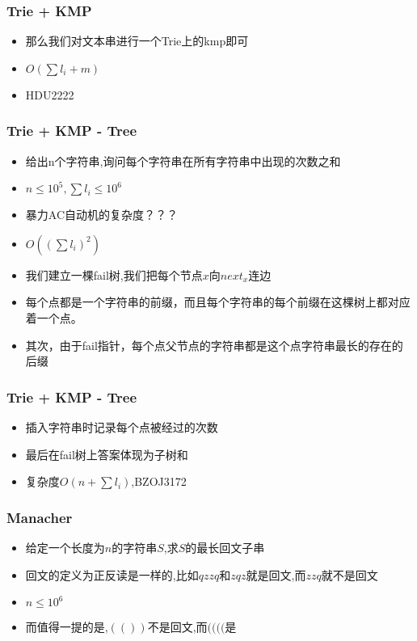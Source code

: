 \documentclass[notheorems]{beamer}
\begin{document}
\begin{frame}
\frametitle{Trie + KMP}
\begin{itemize}[]
\item 那么我们对文本串进行一个Trie上的kmp即可
\item $O(\sum l_i + m)$
\item HDU2222
\end{itemize}
\end{frame}

\begin{frame}
\frametitle{Trie + KMP - Tree}
\begin{itemize}[]
\item 给出n个字符串,询问每个字符串在所有字符串中出现的次数之和
\item $n\leq 10^5,\sum l_i \leq 10^6$
\pause
\item 暴力AC自动机的复杂度？？？
\pause
\item $O((\sum l_i)^2)$
\pause
\item 我们建立一棵fail树,我们把每个节点$x$向$next_x$连边
\pause
\item 每个点都是一个字符串的前缀，而且每个字符串的每个前缀在这棵树上都对应着一个点。
\item 其次，由于fail指针，每个点父节点的字符串都是这个点字符串最长的存在的后缀
\end{itemize}
\end{frame}


\begin{frame}
\frametitle{Trie + KMP - Tree}
\begin{itemize}[]
\item 插入字符串时记录每个点被经过的次数
\item 最后在fail树上答案体现为子树和
\item 复杂度$O(n+\sum l_i)$,BZOJ3172
\end{itemize}
\end{frame}

\begin{frame}
\frametitle{Manacher}
\begin{itemize}[]
\item 给定一个长度为$n$的字符串$S$,求$S$的最长回文子串
\item 回文的定义为正反读是一样的,比如$qzzq$和$zqz$就是回文,而$zzq$就不是回文
\item $n\leq 10^6$
\pause
\item 而值得一提的是,$(())$不是回文,而$(((($是
\end{itemize}
\end{frame}
\end{document}
